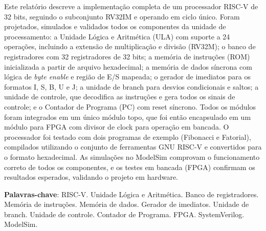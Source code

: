 \documentclass[
	12pt,				%
	oneside,
	a4paper,			%
	english,			%
	french,				%
	spanish,			%
	brazil,				%
	]{abntex2}
\begin{document}

\frenchspacing 


\imprimircapa

\imprimirfolhaderosto*

\setlength{\absparsep}{18pt} %
\begin{resumo}
Este relatório descreve a implementação completa de um processador RISC-V de 32 bits, seguindo o subconjunto RV32IM e operando em ciclo único. Foram projetados, simulados e validados todos os componentes da unidade de processamento: a Unidade Lógica e Aritmética (ULA) com suporte a 24 operações, incluindo a extensão de multiplicação e divisão (RV32M); o banco de registradores com 32 registradores de 32 bits; a memória de instruções (ROM) inicializada a partir de arquivo hexadecimal; a memória de dados síncrona com lógica de \textit{byte enable} e região de E/S mapeada; o gerador de imediatos para os formatos I, S, B, U e J; a unidade de branch para desvios condicionais e saltos; a unidade de controle, que decodifica as instruções e gera todos os sinais de controle; e o Contador de Programa (PC) com reset síncrono. Todos os módulos foram integrados em um único módulo topo, que foi então encapsulado em um módulo para FPGA com divisor de clock para operação em bancada. O processador foi testado com dois programas de exemplo (Fibonacci e Fatorial), compilados utilizando o conjunto de ferramentas GNU RISC-V e convertidos para o formato hexadecimal. As simulações no ModelSim comprovam o funcionamento correto de todos os componentes, e os testes em bancada (FPGA) confirmam os resultados esperados, validando o projeto em hardware.

\noindent
\textbf{Palavras-chave}: RISC-V. Unidade Lógica e Aritmética. Banco de registradores. Memória de instruções. Memória de dados. Gerador de imediatos. Unidade de branch. Unidade de controle. Contador de Programa. FPGA. SystemVerilog. ModelSim.
\end{resumo}
\end{document}
